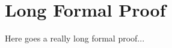 \section{Long Formal Proof}
\label{sec:appendix:formal-proof}


Here goes a really long formal proof...
